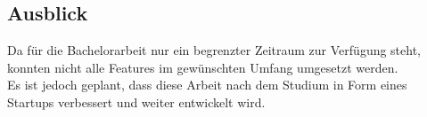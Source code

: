 \subsection{Ausblick}
Da für die Bachelorarbeit nur ein begrenzter Zeitraum zur Verfügung steht, konnten nicht alle Features im gewünschten Umfang umgesetzt werden. \\

Es ist jedoch geplant, dass diese Arbeit nach dem Studium in Form eines Startups verbessert und weiter entwickelt wird.


\newpage